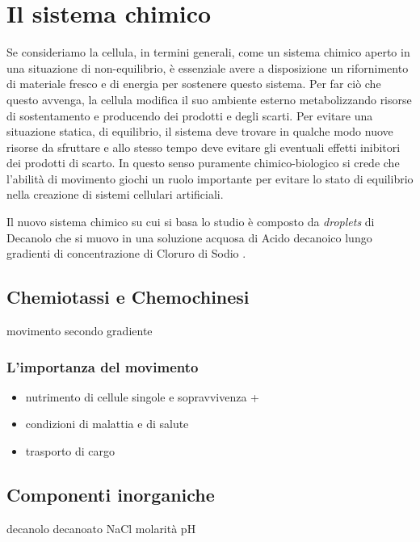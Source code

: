 \chapter{Il sistema chimico}
\vspace{0.5cm}
\label{cha:789}

Se consideriamo la cellula, in termini generali, come un sistema chimico aperto in una situazione di non-equilibrio, è essenziale avere a disposizione un rifornimento di materiale fresco e di energia per sostenere questo sistema. Per far ciò che questo avvenga, la cellula modifica il suo ambiente esterno metabolizzando risorse di sostentamento e producendo dei prodotti e degli scarti. Per evitare una situazione statica, di equilibrio, il sistema deve trovare in qualche modo nuove risorse da sfruttare e allo stesso tempo deve evitare gli eventuali effetti inibitori dei prodotti di scarto. In questo senso puramente chimico-biologico si crede che l'abilità di movimento giochi un ruolo importante per evitare lo stato di equilibrio nella creazione di sistemi cellulari artificiali. \cite{doi:10.1021/ja0706955}

Il nuovo sistema chimico su cui si basa lo studio è composto da \emph{droplets} di Decanolo che si muovo in una soluzione acquosa di Acido decanoico lungo gradienti di concentrazione di Cloruro di Sodio
.

\section{Chemiotassi e Chemochinesi}
\label{sec:456}
movimento secondo gradiente 


    

\subsection{L'importanza del movimento}
\label{sec:00456}
\begin {itemize}
	\item nutrimento di cellule singole e sopravvivenza + 
	\item condizioni di malattia e di salute
	\item trasporto di cargo
\end{itemize}

\section{Componenti inorganiche}
\label{sec:123}
decanolo
decanoato
NaCl  molarità  pH 


